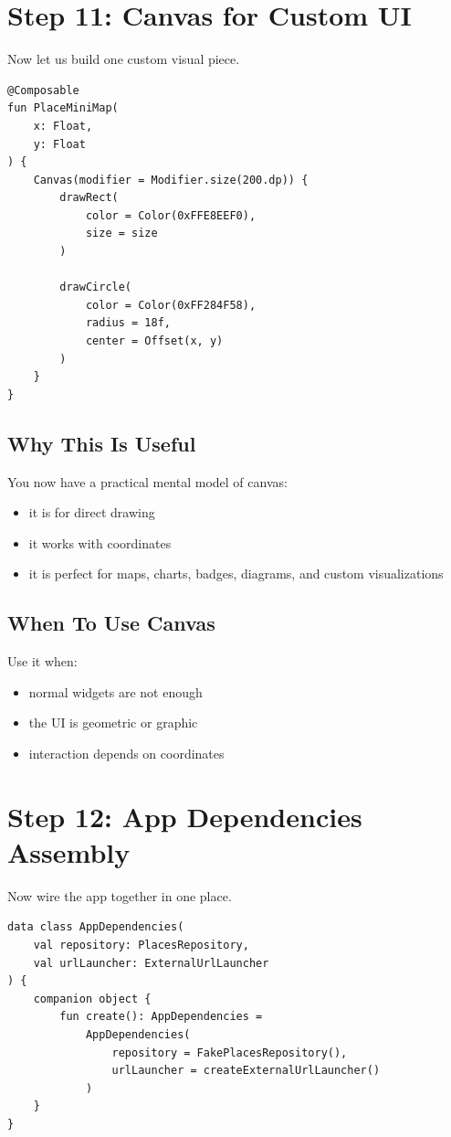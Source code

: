 \documentclass[11pt,a4paper]{article}
\begin{document}
\section{Step 11: Canvas for Custom UI}

Now let us build one custom visual piece.

\begin{lstlisting}[style=kazekotlin]
@Composable
fun PlaceMiniMap(
    x: Float,
    y: Float
) {
    Canvas(modifier = Modifier.size(200.dp)) {
        drawRect(
            color = Color(0xFFE8EEF0),
            size = size
        )

        drawCircle(
            color = Color(0xFF284F58),
            radius = 18f,
            center = Offset(x, y)
        )
    }
}
\end{lstlisting}

\subsection{Why This Is Useful}

You now have a practical mental model of canvas:
\begin{itemize}
    \item it is for direct drawing
    \item it works with coordinates
    \item it is perfect for maps, charts, badges, diagrams, and custom visualizations
\end{itemize}

\subsection{When To Use Canvas}

Use it when:
\begin{itemize}
    \item normal widgets are not enough
    \item the UI is geometric or graphic
    \item interaction depends on coordinates
\end{itemize}

\section{Step 12: App Dependencies Assembly}

Now wire the app together in one place.

\begin{lstlisting}[style=kazekotlin]
data class AppDependencies(
    val repository: PlacesRepository,
    val urlLauncher: ExternalUrlLauncher
) {
    companion object {
        fun create(): AppDependencies =
            AppDependencies(
                repository = FakePlacesRepository(),
                urlLauncher = createExternalUrlLauncher()
            )
    }
}
\end{lstlisting}
\end{document}

